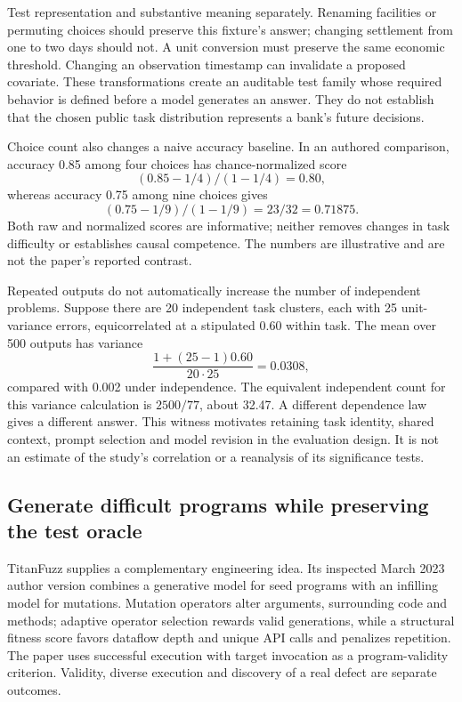 Test representation and substantive meaning separately. Renaming facilities or permuting choices should preserve this fixture's answer; changing settlement from one to two days should not. A unit conversion must preserve the same economic threshold. Changing an observation timestamp can invalidate a proposed covariate. These transformations create an auditable test family whose required behavior is defined before a model generates an answer. They do not establish that the chosen public task distribution represents a bank's future decisions.~\citep{exec24_affordance_fuzzing_reference}

Choice count also changes a naive accuracy baseline. In an authored comparison, accuracy 0.85 among four choices has chance-normalized score
\[
 (0.85-1/4)/(1-1/4)=0.80,
\]
whereas accuracy 0.75 among nine choices gives
\[
 (0.75-1/9)/(1-1/9)=23/32=0.71875.
\]
Both raw and normalized scores are informative; neither removes changes in task difficulty or establishes causal competence. The numbers are illustrative and are not the paper's reported contrast.~\citep{exec24_affordance_fuzzing_reference}

Repeated outputs do not automatically increase the number of independent problems. Suppose there are 20 independent task clusters, each with 25 unit-variance errors, equicorrelated at a stipulated 0.60 within task. The mean over 500 outputs has variance
\[
 \frac{1+(25-1)0.60}{20\cdot25}=0.0308,
\]
compared with 0.002 under independence. The equivalent independent count for this variance calculation is $2500/77$, about 32.47. A different dependence law gives a different answer. This witness motivates retaining task identity, shared context, prompt selection and model revision in the evaluation design. It is not an estimate of the study's correlation or a reanalysis of its significance tests.~\citep{exec24_affordance_fuzzing_reference}

\subsection{Generate difficult programs while preserving the test oracle}
TitanFuzz supplies a complementary engineering idea. Its inspected March 2023 author version combines a generative model for seed programs with an infilling model for mutations. Mutation operators alter arguments, surrounding code and methods; adaptive operator selection rewards valid generations, while a structural fitness score favors dataflow depth and unique API calls and penalizes repetition. The paper uses successful execution with target invocation as a program-validity criterion. Validity, diverse execution and discovery of a real defect are separate outcomes.~\citep{exec24_fuzzing_original}

